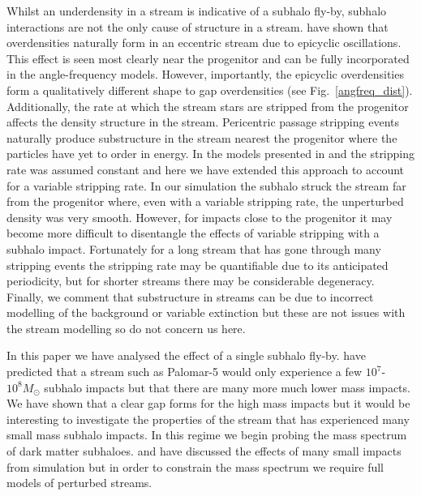 \documentclass[useAMS,usenatbib,fleqn,a4paper]{mn2e}
\begin{document}
Whilst an underdensity in a stream is indicative of a subhalo fly-by, subhalo interactions are not the only cause of structure in a stream. \cite{Kuepper2010} have shown that overdensities naturally form in an eccentric stream due to epicyclic oscillations. This effect is seen most clearly near the progenitor and can be fully incorporated in the angle-frequency models. However, importantly, the epicyclic overdensities form a qualitatively different shape to gap overdensities (see Fig.~\ref{angfreq_dist}). Additionally, the rate at which the stream stars are stripped from the progenitor affects the density structure in the stream. Pericentric passage stripping events naturally produce substructure in the stream nearest the progenitor where the particles have yet to order in energy. In the models presented in \cite{Bovy2014} and \cite{Sanders2014} the stripping rate was assumed constant and here we have extended this approach to account for a variable stripping rate. In our simulation the subhalo struck the stream far from the progenitor where, even with a variable stripping rate, the unperturbed density was very smooth. However, for impacts close to the progenitor it may become more difficult to disentangle the effects of variable stripping with a subhalo impact. Fortunately for a long stream that has gone through many stripping events the stripping rate may be quantifiable due to its anticipated periodicity, but for shorter streams there may be considerable degeneracy. Finally, we comment that substructure in streams can be due to incorrect modelling of the background or variable extinction but these are not issues with the stream modelling so do not concern us here.

In this paper we have analysed the effect of a single subhalo fly-by. \cite{YoonJohnstonHogg} have predicted that a stream such as Palomar-5 would only experience a few $10^7$-$10^8M_\odot$ subhalo impacts but that there are many more much lower mass impacts. We have shown that a clear gap forms for the high mass impacts but it would be interesting to investigate the properties of the stream that has experienced many small mass subhalo impacts. In this regime we begin probing the mass spectrum of dark matter subhaloes. \cite{CarlbergGD12013} and \cite{NganCarlberg2014} have discussed the effects of many small impacts from simulation but in order to constrain the mass spectrum we require full models of perturbed streams.
\end{document}
